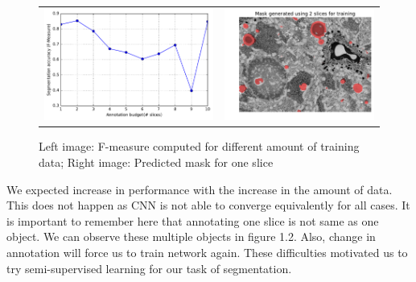 \begin{figure}[h!]\label{fig:cnnslices}
\begin{tabular}{cc}
 \includegraphics[width=0.5\linewidth]{figures/cnn_diff_slices.pdf} & \includegraphics[width=0.5\linewidth]{figures/cnn_mask_2slice.pdf} \\
\end{tabular}
\caption{Left image: F-measure computed for different amount of training data; Right image: Predicted mask for one slice}
\end{figure}
We expected increase in performance with the increase in the amount of data. This does not happen as CNN is not able to converge equivalently for all cases. It is important to remember here that annotating one slice is not same as one object. We can observe these multiple objects in figure 1.2. Also, change in annotation will force us to train network again. These difficulties motivated us to try semi-supervised learning for our task of segmentation.